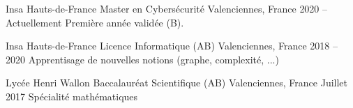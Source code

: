 
\begin{cventries}
  \cventry
    {Insa Hauts-de-France} %
    {Master en Cybersécurité} %
    {Valenciennes, France} %
    {2020 – Actuellement} %
    {Première année validée (B).}
    
  \cventry
    {Insa Hauts-de-France} %
    {Licence Informatique (AB)} %
    {Valenciennes, France} %
    {2018 – 2020} %
    {Apprentisage de nouvelles notions (graphe, complexité, ...)}

  \cventry
    {Lycée Henri Wallon} %
    {Baccalauréat Scientifique (AB)} %
    {Valenciennes, France} %
    {Juillet 2017} %
    {Spécialité mathématiques}
\end{cventries}
